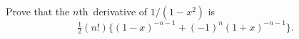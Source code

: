 Prove that the $n$th~derivative of $1/(1 - x^{2})$ is
\[
\tfrac{1}{2}(n!) \{(1 - x)^{-n-1} + (-1)^{n}(1 + x)^{-n-1}\}.
\]

